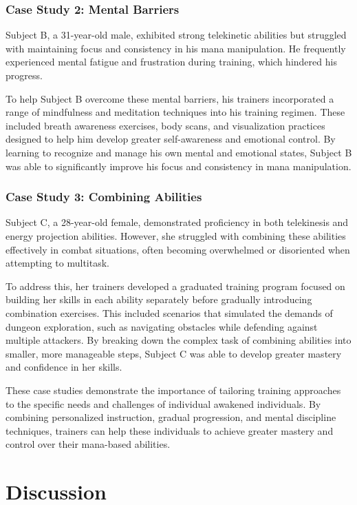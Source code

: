 \documentclass[12pt, a4paper]{article}
\begin{document}
\subsubsection{Case Study 2: Mental Barriers}
Subject B, a 31-year-old male, exhibited strong telekinetic abilities but struggled with maintaining focus and consistency in his mana manipulation. He frequently experienced mental fatigue and frustration during training, which hindered his progress.

To help Subject B overcome these mental barriers, his trainers incorporated a range of mindfulness and meditation techniques into his training regimen. These included breath awareness exercises, body scans, and visualization practices designed to help him develop greater self-awareness and emotional control. By learning to recognize and manage his own mental and emotional states, Subject B was able to significantly improve his focus and consistency in mana manipulation.

\subsubsection{Case Study 3: Combining Abilities}
Subject C, a 28-year-old female, demonstrated proficiency in both telekinesis and energy projection abilities. However, she struggled with combining these abilities effectively in combat situations, often becoming overwhelmed or disoriented when attempting to multitask.

To address this, her trainers developed a graduated training program focused on building her skills in each ability separately before gradually introducing combination exercises. This included scenarios that simulated the demands of dungeon exploration, such as navigating obstacles while defending against multiple attackers. By breaking down the complex task of combining abilities into smaller, more manageable steps, Subject C was able to develop greater mastery and confidence in her skills.

These case studies demonstrate the importance of tailoring training approaches to the specific needs and challenges of individual awakened individuals. By combining personalized instruction, gradual progression, and mental discipline techniques, trainers can help these individuals to achieve greater mastery and control over their mana-based abilities.
\section{Discussion}
\end{document}
